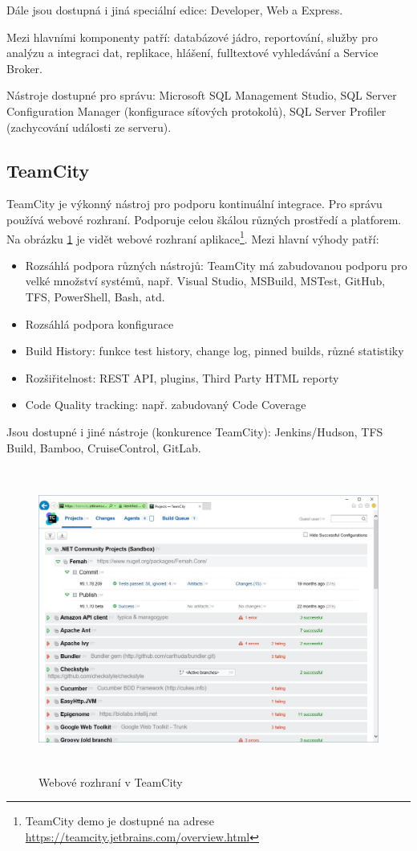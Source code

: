Dále jsou dostupná i jiná speciální edice: Developer, Web a Express.

Mezi hlavními komponenty patří: databázové jádro, reportování, služby pro analýzu a integraci dat, replikace, hlášení, fulltextové vyhledávání a Service Broker.

Nástroje dostupné pro správu: Microsoft SQL Management Studio, SQL Server Configuration Manager (konfigurace síťových protokolů), SQL Server Profiler (zachycování události ze serveru).  \cite{SqlServerIntro}

\subsection{TeamCity}
TeamCity je výkonný nástroj pro podporu kontinuální integrace. Pro správu používá webové rozhraní. Podporuje celou škálou různých prostředí a platforem. Na obrázku \ref{fig:teamcityoverview} je vidět webové rozhraní aplikace\footnote{TeamCity demo je dostupné na adrese \url{https://teamcity.jetbrains.com/overview.html}}. Mezi hlavní výhody patří: 

\begin{itemize}
\item Rozsáhlá podpora různých nástrojů: TeamCity má zabudovanou podporu pro velké množství systémů, např. Visual Studio, MSBuild, MSTest, GitHub, TFS, PowerShell, Bash, atd.
\item Rozsáhlá podpora konfigurace
\item Build History: funkce test history, change log, pinned builds, různé statistiky
\item Rozšiřitelnost: REST API, plugins, Third Party HTML reporty
\item Code Quality tracking: např. zabudovaný Code Coverage
\end{itemize}

Jsou dostupné i jiné nástroje (konkurence TeamCity): Jenkins/Hudson, TFS Build, Bamboo, CruiseControl, GitLab. \cite{TeamCity}

\begin{figure}[]
  \centering
  \includegraphics[height=10cm]{fig/teamcity_overview.jpg}
  \caption{Webové rozhraní v TeamCity}
  \label{fig:teamcityoverview}
\end{figure}

